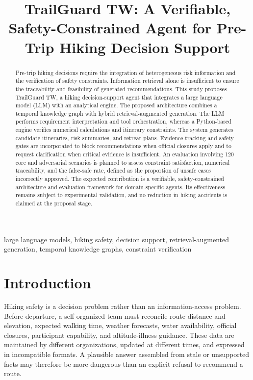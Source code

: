 \documentclass[conference]{IEEEtran}
\title{TrailGuard TW: A Verifiable, Safety-Constrained Agent for Pre-Trip Hiking Decision Support}
\author{
\IEEEauthorblockN{LIAO CHIA HUI}
\IEEEauthorblockA{
\textit{National Chung Hsing University (NCHU)}\\
Taichung City, Taiwan\\
babyish23@gmail.com}
}
\begin{document}
\maketitle

\begin{abstract}
Pre-trip hiking decisions require the integration of heterogeneous risk
information and the verification of safety constraints. Information retrieval
alone is insufficient to ensure the traceability and feasibility of generated
recommendations. This study proposes TrailGuard TW, a hiking decision-support
agent that integrates a large language model (LLM) with an analytical engine.
The proposed architecture combines a temporal knowledge graph with hybrid
retrieval-augmented generation. The LLM performs requirement interpretation
and tool orchestration, whereas a Python-based engine verifies numerical
calculations and itinerary constraints. The system generates candidate
itineraries, risk summaries, and retreat plans. Evidence tracking and safety
gates are incorporated to block recommendations when official closures apply
and to request clarification when critical evidence is insufficient. An
evaluation involving 120 core and adversarial scenarios is planned to assess
constraint satisfaction, numerical traceability, and the false-safe rate,
defined as the proportion of unsafe cases incorrectly approved. The expected
contribution is a verifiable, safety-constrained architecture and evaluation
framework for domain-specific agents. Its effectiveness remains subject to
experimental validation, and no reduction in hiking accidents is claimed at
the proposal stage.
\end{abstract}

\begin{IEEEkeywords}
large language models, hiking safety, decision support, retrieval-augmented
generation, temporal knowledge graphs, constraint verification
\end{IEEEkeywords}

\section{Introduction}
\label{sec:introduction}
Hiking safety is a decision problem rather than an information-access problem.
Before departure, a self-organized team must reconcile route distance and
elevation, expected walking time, weather forecasts, water availability,
official closures, participant capability, and altitude-illness guidance.
These data are maintained by different organizations, updated at different
times, and expressed in incompatible formats. A plausible answer assembled
from stale or unsupported facts may therefore be more dangerous than an
explicit refusal to recommend a route.
\end{document}
